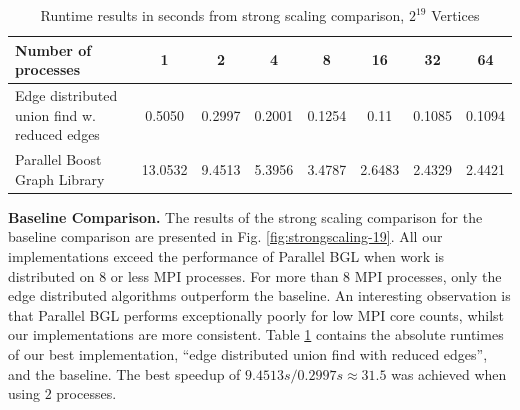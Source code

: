 \documentclass[letterpaper]{article}
\newcommand{\mypar}[1]{{\bf #1.}}
\begin{document}
\begin{table}
  \begin{tabularx}{\linewidth}{ l | c  c  c  c  c  c  c }
    \toprule
    \textbf{Number of processes} & \textbf{1} & \textbf{2} & \textbf{4} & \textbf{8} & \textbf{16} & \textbf{32} & \textbf{64} \\\midrule
    Edge distributed union find w. reduced edges & 0.5050 & 0.2997 & 0.2001 & 0.1254 & 0.11 & 0.1085 & 0.1094 \\ 
    Parallel Boost Graph Library & 13.0532 & 9.4513 & 5.3956 & 3.4787 & 2.6483 & 2.4329 & 2.4421 \\ \bottomrule \hline
  \end{tabularx}
  \caption{Runtime results in seconds from strong scaling comparison, $2^{19}$ Vertices}
  \label{tab:strongscaling-19-table}
\end{table}

\mypar{Baseline Comparison}
The results of the strong scaling comparison for the baseline comparison are presented in Fig. \ref{fig:strongscaling-19}.
All our implementations exceed the performance of Parallel BGL when work is distributed on $8$ or
less MPI processes. For more than $8$ MPI processes, only the edge distributed algorithms outperform the baseline. An
interesting observation is that Parallel BGL performs exceptionally poorly for low MPI core counts, whilst our
implementations are more consistent. Table \ref{tab:strongscaling-19-table} contains the absolute runtimes of our
best implementation, ``edge distributed union find with reduced edges'', and the baseline. The best speedup of
$9.4513s/0.2997s \approx 31.5$ was achieved when using $2$ processes.
\end{document}
